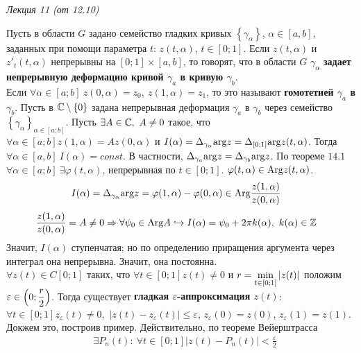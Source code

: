 \begin{flushright}
    \textit{Лекция 11 (от 12.10)}
\end{flushright}
\Def
Пусть в области $G$ задано семейство гладких кривых $\left\{ \gamma_\alpha
\right\}$, $\alpha \in [a,b]$, заданных при помощи параметра $t$: $z(t,
\alpha)$, $t \in [0;1]$. Если $z(t, \alpha)$ и $z'_t(t, \alpha)$ непрерывны на
$[0;1] \times [a,b]$, то говорят, что в области $G$ $\gamma_{\alpha}$
\textbf{задает непрерывную деформацию кривой $\gamma_a$ в кривую $\gamma_b$}.
\\
Если $\forall \alpha \in [a;b] \ z(0, \alpha) = z_0, \ z(1, \alpha) = z_1$, то
это называют \textbf{гомотетией $\gamma_a$ в $\gamma_b$}.
\theorem
Пусть в $\mathbb{C} \setminus \{0\}$ задана непрерывная деформация $\gamma_a$ в
$\gamma_b$ через семейство $\left\{ \gamma_\alpha \right\}_{\alpha \in [a;b]}$.
Пусть $\exists A \in \mathbb{C}, \ A \neq 0$ такое, что $\forall \alpha \in [a;b] z(1,
\alpha) = Az(0, \alpha)$ и $I(\alpha) = \Delta_{\gamma_\alpha}\mathrm{arg} z =
\Delta_{[0;1]}\mathrm{arg} z(t, \alpha)$. Тогда $\forall \alpha \in [a,b] \ I(\alpha) =
const$. В частности, $\Delta_{\gamma_a}\mathrm{arg} z = \Delta_{\gamma_b}\mathrm{arg} z$.
\pr
По теореме $14.1$ $\forall \alpha \in [a;b] \ \exists \varphi(t, \alpha)$,
непрерывная по $t \in [0;1]$. $\varphi(t, \alpha) \in \mathrm{Arg} z (t, \alpha)$.
\begin{align*}
  & I(\alpha) = \Delta_{\gamma_\alpha}\mathrm{arg} z = \varphi(1, \alpha) - \varphi(0, \alpha) \in \mathrm{Arg} \frac{z(1, \alpha)}{z(0, \alpha)}
\end{align*}
\begin{align*}
  & \frac{z(1, \alpha)}{z(0, \alpha)} = A \neq 0 \Rightarrow \forall \psi_0 \in \Arg A \hookrightarrow I(\alpha) = \psi_0+2\pi k(\alpha), \ k(\alpha) \in \ZZ
\end{align*}
Значит, $I(\alpha)$ ступенчатая; но по определению приращения аргумента через
интеграл она непрерывна. Значит, она постоянна.
\\
$\forall z(t) \in C[0;1]$ таких, что $\forall t \in [0;1] z(t) \neq 0$ и $r =
\displaystyle \min_{t \in [0;1]} \left| z(t) \right|$ положим $\varepsilon\in \left( 0;
    \displaystyle \frac{r}{2} \right)$. Тогда существует \textbf{гладкая
  $\varepsilon$-аппроксимация $z(t)$}: $\forall t \in [0;1] z_\varepsilon(t)
\neq 0,$ $\left| z(t) - z_\varepsilon(t) \right| \leq \varepsilon$,
$z_\varepsilon(0) = z(0)$, $z_\varepsilon(1) = z(1)$.
\\
Докжем это, построив пример. Действительно, по теореме Вейерштрасса
\begin{align*}
  & \exists P_n(t): \ \forall t \in [0;1] \left| z(t) - P_n(t) \right| < \frac{\varepsilon}{2}
\end{align*}
